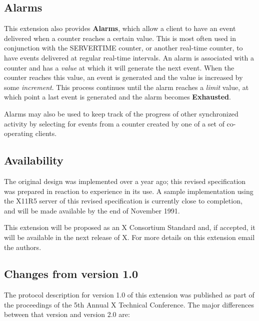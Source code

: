 \subsection*{Alarms}

This extension also provides {\bf Alarms}, which allow a client to have an
event delivered when a counter reaches a certain value. This is most often
used in conjunction with the SERVERTIME counter, or another real-time counter,
to have events delivered at regular real-time intervals.  An alarm is
associated with a counter and has a {\it value} at which it will generate the
next event. When the counter reaches this value, an event is generated and the
value is increased by some {\it increment}. This process continues until the
alarm reaches a {\it limit} value, at which point a last event is generated
and the alarm becomes {\bf Exhausted}.

Alarms may also be used to keep track of the progress of other synchronized
activity by selecting for events from a counter created by one of a set of
co-operating clients.

\subsection*{Availability}

The original design was implemented over a year ago; this revised
specification was prepared in reaction to experience in its use. A sample
implementation using the X11R5 server of this revised specification is
currently close to completion, and will be made available by the end of
November 1991.


This extension will be proposed as an X Consortium Standard and, if accepted,
it will be available in the next release of X.  For more details on this
extension email the authors.

\subsection*{Changes from version 1.0}

The protocol description for version 1.0 of this extension was published as
part of the proceedings of the 5th Annual X Technical Conference. The major
differences between that version and version 2.0 are:

